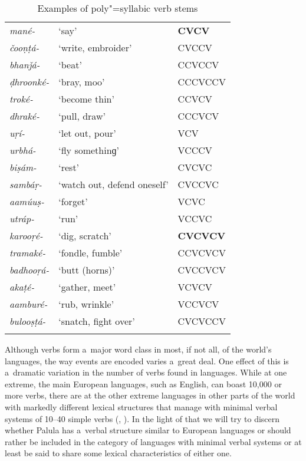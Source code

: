 \begin{table}[p]
\caption{Examples of poly"=syllabic verb stems}
\begin{tabularx}{\textwidth}{ Q l Q }
\lsptoprule
\textit{mané-} &
`say' &
\textbf{CVCV} \\
\textit{čooṇṭá-} &
`write, embroider' &
CVCCV\\
\textit{bhanǰá-} &
`beat' &
CCVCCV\\
\textit{ḍhroonké-} &
`bray, moo' &
CCCVCCV\\
\textit{troké-} &
`become thin' &
CCVCV\\
\textit{dhraké-} &
`pull, draw' &
CCCVCV\\
\textit{uṛí-} &
`let out, pour' &
VCV\\
\textit{urbhá-} &
`fly somethinɡ' &
VCCCV\\
\textit{biṣám-} &
`rest' &
CVCVC\\
\textit{sambáṛ-} &
`watch out, defend oneself' &
CVCCVC\\
\textit{aamúuṣ-} &
`forget' &
VCVC\\
\textit{utráp-} &
`run' &
VCCVC\\
\textit{karooṛé-} &
`dig, scratch' &
\textbf{CVCVCV}\\
\textit{tramaké-} &
`fondle, fumble' &
CCVCVCV\\
\textit{badhooṛá-} &
`butt (horns)' &
CVCCVCV\\
\textit{akaṭé-} &
`gather, meet' &
VCVCV\\
\textit{aamburé-} &
`rub, wrinkle' &
VCCVCV\\
\textit{bulooṣṭá-} &
`snatch, fight over' &
CVCVCCV
\\\lspbottomrule
\end{tabularx}
\label{tab:8-poly}
\end{table}

Although verbs form a~major word class in most, if not all, of the world's languages, the way events are encoded varies a~great deal. One effect of this is a~dramatic variation in the number of verbs found in languages. While at one extreme, the main European languages, such as English, can boast 10,000 or more verbs, there are at the other extreme languages in other parts of the world with markedly different lexical structures that manage with minimal verbal systems of 10--40 simple verbs (\citealt[347--348]{viberg1993}, \citeyear[409]{viberg2006}). In the light of that we will try to discern whether Palula has a~verbal structure similar to European languages or should rather be included in the category of languages with minimal verbal systems or at least be said to share some lexical characteristics of either one.



